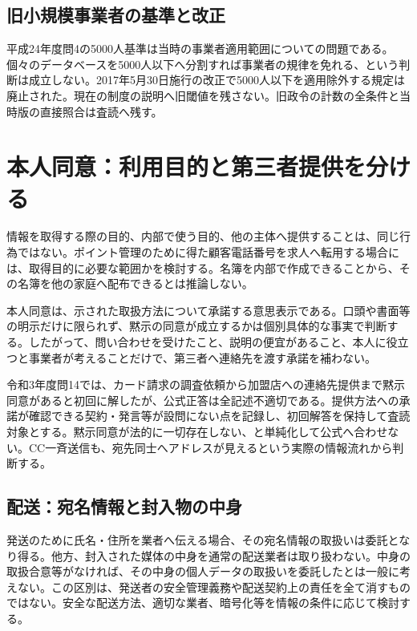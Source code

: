 \subsection{旧小規模事業者の基準と改正}
\label{theory:privacy:history}
平成24年度問4の5000人基準は当時の事業者適用範囲についての問題である。個々のデータベースを5000人以下へ分割すれば事業者の規律を免れる、という判断は成立しない。2017年5月30日施行の改正で5000人以下を適用除外する規定は廃止された\parencite{privacy_small2017}。現在の制度の説明へ旧閾値を残さない。旧政令の計数の全条件と当時版の直接照合は査読へ残す。

\section{本人同意：利用目的と第三者提供を分ける}
\label{theory:privacy:consent}
情報を取得する際の目的、内部で使う目的、他の主体へ提供することは、同じ行為ではない。ポイント管理のために得た顧客電話番号を求人へ転用する場合には、取得目的に必要な範囲かを検討する。名簿を内部で作成できることから、その名簿を他の家庭へ配布できるとは推論しない。

本人同意は、示された取扱方法について承諾する意思表示である。口頭や書面等の明示だけに限られず、黙示の同意が成立するかは個別具体的な事実で判断する\parencite{privacy_consent2017,privacy_consent_current}。したがって、問い合わせを受けたこと、説明の便宜があること、本人に役立つと事業者が考えることだけで、第三者へ連絡先を渡す承諾を補わない。

令和3年度問14では、カード請求の調査依頼から加盟店への連絡先提供まで黙示同意があると初回に解したが、公式正答は全記述不適切である。提供方法への承諾が確認できる契約・発言等が設問にない点を記録し、初回解答を保持して査読対象とする。黙示同意が法的に一切存在しない、と単純化して公式へ合わせない。CC一斉送信も、宛先同士へアドレスが見えるという実際の情報流れから判断する。

\subsection{配送：宛名情報と封入物の中身}
\label{theory:privacy:delivery}
発送のために氏名・住所を業者へ伝える場合、その宛名情報の取扱いは委託となり得る。他方、封入された媒体の中身を通常の配送業者は取り扱わない。中身の取扱合意等がなければ、その中身の個人データの取扱いを委託したとは一般に考えない\parencite{privacy_delivery}。この区別は、発送者の安全管理義務や配送契約上の責任を全て消すものではない。安全な配送方法、適切な業者、暗号化等を情報の条件に応じて検討する。

